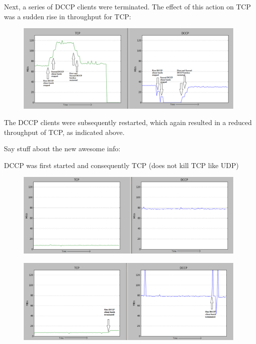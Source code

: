 \documentclass[10pt,a4paper]{article}
\begin{document}
Next, a series of DCCP clients were terminated. The effect of this action on TCP was a sudden rise in throughput for TCP:

\begin{figure}[!h]
\begin{center}
\includegraphics[scale=.4]{screens/re/Screenshot-12.png}
\end{center}
\end{figure}

The DCCP clients were subsequently restarted, which again resulted in a reduced throughput of TCP, as indicated above.

Say stuff about the new awesome info:

DCCP was first started and consequently TCP (does not kill TCP like UDP)

\begin{figure}[!h]
\begin{center}
\hspace*{-65pt}
\includegraphics[scale=.52]{screens/re/Screenshot-3.png}
\end{center}
\end{figure}

\begin{figure}[!h]
\begin{center}
\hspace*{-65pt}
\includegraphics[scale=.52]{screens/re/Screenshot-1.png}
\end{center}
\end{figure}
\end{document}
